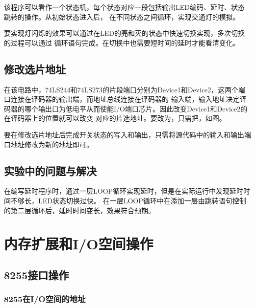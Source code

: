 \documentclass[12pt, a4paper, oneside]{ctexart}
\begin{document}
    该程序可以看作一个状态机，每个状态对应一段包括输出LED编码、延时、状态跳转的操作。从初始状态进入后，
    在不同状态之间循环，实现交通灯的模拟。

    要实现灯闪烁的效果可以通过在LED的亮和灭的状态中快速切换实现，多次切换的过程可以通过
    循环语句完成。在切换中也需要短时间的延时才能看清变化。
    \subsection{修改选片地址}
    在该电路中，74LS244和74LS273的片段端口分别为Device1和Device2，这两个端口连接在译码器的输出端，而地址总线连接在译码器的
    输入端，输入地址决定译码器的哪个输出口为低电平从而使能I/O端口芯片。因此改变Device1和Device2的在译码器上的位置就可以改变
    对应的片选地址。要改为，只需把，如图。

    要在修改选片地址后完成开关状态的写入和输出，只需将源代码中的输入和输出端口地址修改为新的地址即可。

    \subsection{实验中的问题与解决}
    在编写延时程序时，通过一层LOOP循环实现延时，但是在实际运行中发现延时时间不够长，LED状态切换过快。
    在一层LOOP循环中在添加一层由跳转语句控制的第二层循环后，延时时间变长，效果符合预期。
    \section{内存扩展和I/O空间操作}
    \subsection{8255接口操作}
    \subsubsection{8255在I/O空间的地址}
\end{document}
